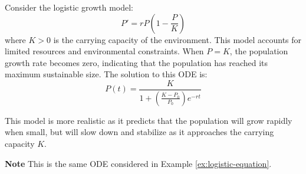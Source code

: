 \documentclass[11pt]{article}
\begin{document}
\begin{example}
    Consider the logistic growth model:
        $$
        P' = rP\left(1 - \frac{P}{K}\right)
        $$
        where \( K > 0 \) is the carrying capacity of the environment. This model accounts for limited resources and environmental constraints. When $P = K$, the population growth rate becomes zero, indicating that the population has reached its maximum sustainable size.
        The solution to this ODE is:
        $$
        P(t) = \frac{K}{1 + \left(\frac{K - P_0}{P_0}\right)e^{-rt}}
        $$

        This model is more realistic as it predicts that the population will grow rapidly when small, but will slow down and stabilize as it approaches the carrying capacity \( K \).

        \textbf{Note} This is the same ODE considered in Example \ref{ex:logistic-equation}.

        \begin{figure}[h!]
            \centering
            \begin{minipage}[b]{0.48\textwidth}
                \centering
                \vspace{1mm}


\end{minipage}
\end{figure}
\end{example}
\end{document}
